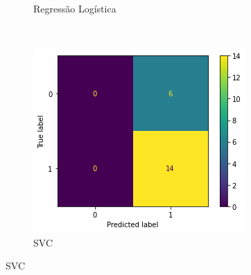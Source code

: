 \begin{figure}[htb]
\begin{subfigure}[b]{0.45\textwidth}
        \caption{Regressão Logística}
        \label{fig:resultados:base-de-dados-24.3-confusion-matrix-logisticregression-monthly-secao}
    \end{subfigure} ~ \quad
    \begin{subfigure}[b]{0.45\textwidth}
        \includegraphics[scale=0.75]{images/base-de-dados-24.2-confusion-matrix-svc-monthly-secao.png}
        \caption{SVC}
        \label{fig:resultados:base-de-dados-24.1-confusion-matrix-svc-monthly-secao}
    \end{subfigure}
    \fdadospesquisa
\end{figure}


